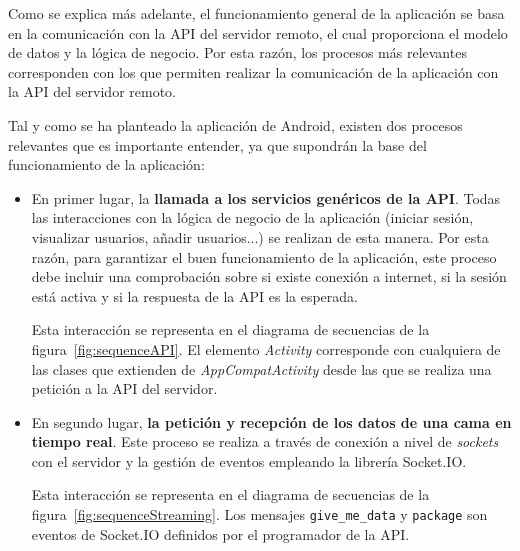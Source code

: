 Como se explica más adelante, el funcionamiento general de la aplicación se basa en la comunicación con la API del servidor remoto, el cual proporciona el modelo de datos y la lógica de negocio. Por esta razón, los procesos más relevantes corresponden con los que permiten realizar la comunicación de la aplicación con la API del servidor remoto. 

Tal y como se ha planteado la aplicación de Android, existen dos procesos relevantes que es importante entender, ya que supondrán la base del funcionamiento de la aplicación:

\begin{itemize}
	\item En primer lugar, la \textbf{llamada a los servicios genéricos de la API}. Todas las interacciones con la lógica de negocio de la aplicación (iniciar sesión, visualizar usuarios, añadir usuarios...) se realizan de esta manera. Por esta razón, para garantizar el buen funcionamiento de la aplicación, este proceso debe incluir una comprobación sobre si existe conexión a internet, si la sesión está activa y si la respuesta de la API es la esperada.
	
	Esta interacción se representa en el diagrama de secuencias de la figura~\ref{fig:sequenceAPI}. El elemento \textit{Activity} corresponde con cualquiera de las clases que extienden de \textit{AppCompatActivity} desde las que se realiza una petición a la API del servidor. 
	
	\item En segundo lugar, \textbf{la petición y recepción de los datos de una cama en tiempo real}. Este proceso se realiza a través de conexión a nivel de \textit{sockets} con el servidor y la gestión de eventos empleando la librería Socket.IO. 
	
	Esta interacción se representa en el diagrama de secuencias de la figura~\ref{fig:sequenceStreaming}. Los mensajes \texttt{give\_me\_data} y \texttt{package} son eventos de Socket.IO definidos por el programador de la API. 
\end{itemize}

